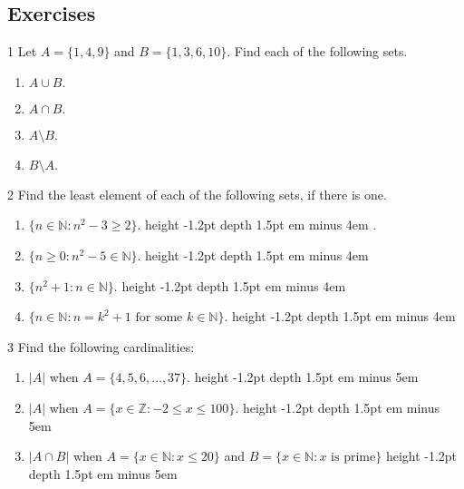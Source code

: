 \documentclass[11pt,]{book}
\newcommand{\fillin}[1]{\leavevmode\leaders\vrule height -1.2pt depth 1.5pt \hskip #1em minus #1em \null}
\theoremstyle{ptxplainnotitle}
\theoremstyle{ptxplaintitle}
\theoremstyle{ptxdefinitionnotitle}
\theoremstyle{ptxdefinitiontitle}
\theoremstyle{ptxdefinitionnotitle}
\theoremstyle{ptxdefinitiontitle}
\theoremstyle{ptxdefinitionnotitle}
\theoremstyle{ptxdefinitiontitle}
\theoremstyle{ptxdefinitiontitlenonumber}
\theoremstyle{ptxdefinitiontitlenonumber}
\numberwithin{equation}{chapter}
\newcommand{\N}{\mathbb N}
\newcommand{\Z}{\mathbb Z}
\newcommand{\st}{:}
\begin{document}
\subsection*{Exercises}\hypertarget{exercises_intro-sets}{}
\begin{divisionexercise}{1}\hypertarget{exercise-78}{}
\hypertarget{p-769}{}%
Let \(A = \{1, 4, 9\}\) and \(B = \{1, 3, 6, 10\}\text{.}\)  Find each of the following sets. \leavevmode%
\begin{enumerate}[label=\alph*.]
\item\hypertarget{li-338}{}\hypertarget{p-770}{}%
\(A \cup B\text{.}\)%
\item\hypertarget{li-339}{}\hypertarget{p-772}{}%
\(A \cap B\text{.}\)%
\item\hypertarget{li-340}{}\hypertarget{p-774}{}%
\(A \setminus B\text{.}\)%
\item\hypertarget{li-341}{}\hypertarget{p-776}{}%
\(B \setminus A\text{.}\)%
\end{enumerate}
%
\end{divisionexercise}%
\begin{divisionexercise}{2}\hypertarget{exercise-79}{}
\hypertarget{p-794}{}%
Find the least element of each of the following sets, if there is one. \leavevmode%
\begin{enumerate}[label=\alph*.]
\item\hypertarget{li-354}{}\hypertarget{p-795}{}%
\(\{n \in \N \st n^2 - 3 \ge 2\}\text{.}\)   \fillin{4}.%
\item\hypertarget{li-355}{}\hypertarget{p-796}{}%
\(\{n \ge 0 \st n^2 - 5 \in \N\}\text{.}\)   \fillin{4}%
\item\hypertarget{li-356}{}\hypertarget{p-797}{}%
\(\{n^2+1 \st n \in \N\}\text{.}\)  \fillin{4}%
\item\hypertarget{li-357}{}\hypertarget{p-798}{}%
\(\{n \in \N \st n = k^2 + 1 \text{ for some } k \in \N\}\text{.}\)  \fillin{4}%
\end{enumerate}
%
\end{divisionexercise}%
\begin{divisionexercise}{3}\hypertarget{exercise-80}{}
\hypertarget{p-813}{}%
Find the following cardinalities: \leavevmode%
\begin{enumerate}[label=\alph*.]
\item\hypertarget{li-368}{}\hypertarget{p-814}{}%
\(|A|\) when \(A = \{4,5,6,\ldots,37\}\text{.}\)   \fillin{5}%
\item\hypertarget{li-369}{}\hypertarget{p-815}{}%
\(|A|\) when \(A = \{x \in \Z \st -2 \le x \le 100\}\text{.}\)   \fillin{5}%
\item\hypertarget{li-370}{}\hypertarget{p-816}{}%
\(|A \cap B|\) when \(A = \{x \in \N \st x \le 20\}\) and \(B = \{x \in \N \st x \mbox{ is prime} \}\)  \fillin{5}%
\end{enumerate}
%
\end{divisionexercise}%
\end{document}
